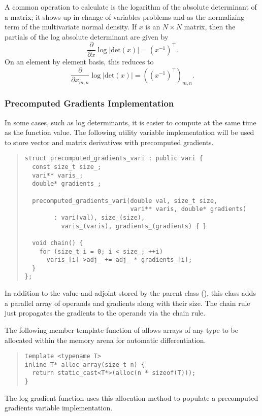 \documentclass[10pt]{article}
\begin{document}
A common operation to calculate is the logarithm of the absolute
determinant of a matrix; it shows up in change of variables problems
and as the normalizing term of the multivariate normal density.  If
$x$ is an $N \times N$ matrix, then the partials of the log absolute
determinant are given by
\[
\frac{\partial}{\partial x} \log | \mbox{det}(x) |
= \left( x^{-1} \right)^{\top}.
\]
On an element by element basis, this reduces to
\[
\frac{\partial}{\partial x_{m,n}} \log | \mbox{det}(x) |
= \left( \left( x^{-1} \right)^{\top}\right)_{m,n}.
\]

\subsubsection{Precomputed Gradients Implementation}

In some cases, such as log determinants, it is easier to compute at
the same time as the function value.  The following utility variable
implementation will be used to store vector and matrix derivatives
with precomputed gradients.
%
\begin{quote}
\begin{Verbatim}
struct precomputed_gradients_vari : public vari {
  const size_t size_;
  vari** varis_;
  double* gradients_;

  precomputed_gradients_vari(double val, size_t size, 
                             vari** varis, double* gradients)
        : vari(val), size_(size),
          varis_(varis), gradients_(gradients) { }

  void chain() {
    for (size_t i = 0; i < size_; ++i) 
      varis_[i]->adj_ += adj_ * gradients_[i];
  }
};
\end{Verbatim}
\end{quote}
%
In addition to the value and adjoint stored by the parent class
(), this class adds a parallel array of operands and
gradients along with their size.  The chain rule just propagates the
gradients to the operands via the chain rule.

The following member template function of  allows
arrays of any type to be allocated within the memory arena for
automatic differentiation.
%
\begin{quote}
\begin{Verbatim}
template <typename T>
inline T* alloc_array(size_t n) {
  return static_cast<T*>(alloc(n * sizeof(T)));
}
\end{Verbatim}
\end{quote}
%
The log gradient function uses this allocation method to populate a
precomputed gradients variable implementation.
\end{document}
